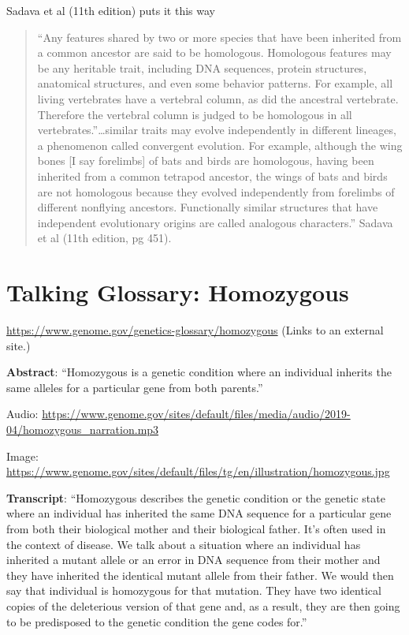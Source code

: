 \documentclass[
]{book}
\begin{document}
Sadava et al (11th edition) puts it this way

\begin{quote}
``Any features shared by two or more species that have been inherited from a common ancestor are said to be homologous. Homologous features may be any heritable trait, including DNA sequences, protein structures, anatomical structures, and even some behavior patterns. For example, all living vertebrates have a vertebral column, as did the ancestral vertebrate. Therefore the vertebral column is judged to be homologous in all vertebrates.''\ldots similar traits may evolve independently in different lineages, a phenomenon called convergent evolution. For example, although the wing bones {[}I say forelimbs{]} of bats and birds are homologous, having been inherited from a common tetrapod ancestor, the wings of bats and birds are not homologous because they evolved independently from forelimbs of different nonflying ancestors. Functionally similar structures that have independent evolutionary origins are called analogous characters.'' Sadava et al (11th edition, pg 451).
\end{quote}

\hypertarget{talking-glossary-homozygous}{%
\section{Talking Glossary: Homozygous}\label{talking-glossary-homozygous}}

\url{https://www.genome.gov/genetics-glossary/homozygous} (Links to an external site.)

\textbf{Abstract}: ``Homozygous is a genetic condition where an individual inherits the same alleles for a particular gene from both parents.''

Audio: \url{https://www.genome.gov/sites/default/files/media/audio/2019-04/homozygous_narration.mp3}

Image: \url{https://www.genome.gov/sites/default/files/tg/en/illustration/homozygous.jpg}

\textbf{Transcript}: ``Homozygous describes the genetic condition or the genetic state where an individual has inherited the same DNA sequence for a particular gene from both their biological mother and their biological father. It's often used in the context of disease. We talk about a situation where an individual has inherited a mutant allele or an error in DNA sequence from their mother and they have inherited the identical mutant allele from their father. We would then say that individual is homozygous for that mutation. They have two identical copies of the deleterious version of that gene and, as a result, they are then going to be predisposed to the genetic condition the gene codes for.''
\end{document}
